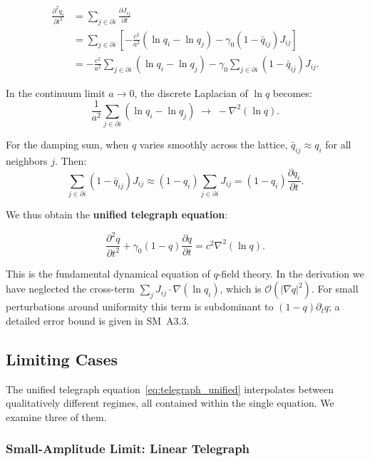 \documentclass[aps,prd,twocolumn,showpacs,superscriptaddress,preprintnumbers]{revtex4-2}
\begin{document}
\begin{align}
\frac{\partial^2 q_i}{\partial t^2} &= \sum_{j \in \partial i} \frac{\partial J_{ij}}{\partial t} \nonumber \\
&= \sum_{j \in \partial i} \left[-\frac{c^2}{a^2}(\ln q_i - \ln q_j) - \gamma_0(1-\bar{q}_{ij})J_{ij}\right] \nonumber \\
&= -\frac{c^2}{a^2} \sum_{j \in \partial i} (\ln q_i - \ln q_j) - \gamma_0 \sum_{j \in \partial i}(1-\bar{q}_{ij})J_{ij}.
\label{eq:telegraph_step}
\end{align}

In the continuum limit $a\to0$, the discrete Laplacian of $\ln q$ becomes:
\begin{equation}
\frac{1}{a^2}\sum_{j \in \partial i}(\ln q_i - \ln q_j) \;\longrightarrow\; -\nabla^2(\ln q).
\end{equation}

For the damping sum, when $q$ varies smoothly across the lattice, $\bar{q}_{ij}\approx q_i$ for all neighbors $j$.
Then:
\begin{equation}
\sum_{j \in \partial i}(1-\bar{q}_{ij})J_{ij} \approx (1-q_i)\sum_{j \in \partial i}J_{ij} = (1-q_i)\frac{\partial q_i}{\partial t}.
\end{equation}

We thus obtain the \textbf{unified telegraph equation}:

\begin{equation}
\boxed{\frac{\partial^2 q}{\partial t^2} + \gamma_0(1-q)\frac{\partial q}{\partial t} = c^2\nabla^2(\ln q)}.
\label{eq:telegraph_unified}
\end{equation}

This is the fundamental dynamical equation of $q$-field theory.
In the derivation we have neglected the cross-term $\sum_j J_{ij}\cdot\nabla(\ln q_i)$, which is $\mathcal{O}(|\nabla q|^2)$. For small perturbations around uniformity this term is subdominant to $(1-q)\partial_t q$; a detailed error bound is given in SM~A3.3.

\subsection{Limiting Cases}

The unified telegraph equation~\eqref{eq:telegraph_unified} interpolates between qualitatively different regimes, all contained within the single equation.
We examine three of them.

\subsubsection{Small-Amplitude Limit: Linear Telegraph}
\end{document}
